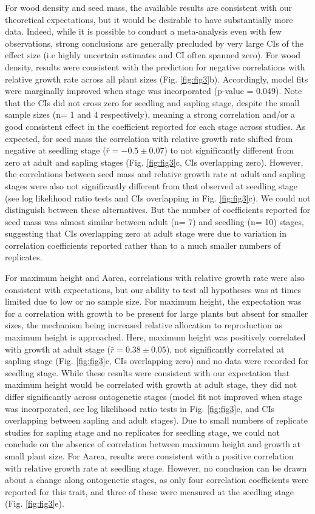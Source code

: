 \documentclass[a4paper,11pt]{article}
\begin{document}
For wood density and seed mass, the available results are consistent with our theoretical expectations, but it would be desirable to have substantially more data. Indeed, while it is possible to conduct a meta-analysis even with few observations, strong conclusions are generally precluded by very large CIs of the effect size (i.e highly uncertain estimates and CI often spanned zero). 
For wood density, results were consistent with the prediction for negative correlations with relative growth rate across all plant sizes (Fig. \ref{fig:fig3}b). Accordingly, model fits were marginally improved when stage was incorporated (p-value = 0.049). Note that the CIs did not cross zero for seedling and sapling stage, despite the small sample sizes (n= 1 and 4 respectively), meaning a strong correlation and/or a good consistent effect in the coefficient reported for each stage across studies. 
As expected, for seed mass the correlation with relative growth rate shifted from negative at seedling stage ($\bar{r}= -0.5 \pm 0.07$) to not significantly different from zero at adult and sapling stages (Fig. \ref{fig:fig3}c, CIs overlapping zero). However, the correlations between seed mass and relative growth rate at adult and sapling stages were also not significantly different from that observed at seedling stage (see log likelihood ratio tests and CIs overlapping in Fig. \ref{fig:fig3}c). We could not distinguish between these alternatives. But the number of coefficients reported for seed mass was almost similar between adult (n= 7) and seedling (n= 10) stages, suggesting that CIs overlapping zero at adult stage were due to variation in correlation coefficients reported rather than to a much smaller numbers of replicates.

For maximum height and Aarea, correlations with relative growth rate were also consistent with expectations, but our ability to test all hypotheses was at times limited due to low or no sample size. For maximum height, the expectation was for a correlation with growth to be present for large plants but absent for smaller sizes, the mechanism being increased relative allocation to reproduction as maximum height is approached. Here, maximum height was positively correlated with growth at adult stage ($\bar{r}= 0.38 \pm 0.05$), not significantly correlated at sapling stage (Fig. \ref{fig:fig3}c, CIs overlapping zero) and no data were recorded for seedling stage. While these results were consistent with our expectation that maximum height would be correlated with growth at adult stage, they did not differ significantly across ontogenetic stages (model fit not improved when stage was incorporated, see log likelihood ratio tests in Fig. \ref{fig:fig3}c, and CIs overlapping between sapling and adult stages). Due to small numbers of replicate studies for sapling stage and no replicates for seedling stage, we could not conclude on the absence of correlation between maximum height and growth at small plant size.
For Aarea, results were consistent with a positive correlation with relative growth rate at seedling stage. However, no conclusion can be drawn about a change along ontogenetic stages, as only four correlation coefficients were reported for this trait, and three of these were measured at the seedling stage (Fig. \ref{fig:fig3}e).
\end{document}
